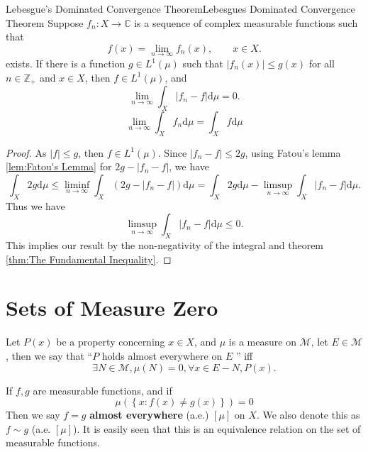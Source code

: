 \documentclass[../main.tex]{subfiles}
\begin{document}
\begin{theorem}{Lebesgue's Dominated Convergence Theorem}{Lebesgues Dominated Convergence Theorem}
	Suppose $f_n: X \rightarrow \mathbb{C}$ is a sequence of complex measurable functions such that
	\begin{equation*}
		f(x) = \lim_{n\rightarrow \infty } f_n(x), \qquad x\in X.
	\end{equation*}
	exists. If there is a function $g\in L^1(\mu)$ such that $\left|f_n(x)\right| \leq g(x)$ for all $n\in \mathbb{Z}_+$ and $x\in X$, then $f\in L^1(\mu)$, and
	\begin{equation*}
		\lim_{n \to \infty } \int_X \left|f_n-f\right| \mathrm{d} \mu = 0.
	\end{equation*}
	\begin{equation*}
		 \lim_{n \to \infty } \int_X f_n \mathrm{d} \mu = \int_X f \mathrm{d} \mu
	\end{equation*}
\end{theorem}
\begin{proof}
	As $\left|f\right|\leq g$, then $f\in L^1(\mu)$. Since $\left|f_n-f\right|\leq 2g$, using Fatou's lemma \ref{lem:Fatou's Lemma} for $2g-\left|f_n-f\right|$, we have
	\begin{equation*}
		\int_X 2g \mathrm{d} \mu \leq \liminf_{n\rightarrow \infty } \int_X \left(2g - \left|f_n-f\right|\right) \mathrm{d} \mu = \int_X 2g \mathrm{d} \mu - \limsup_{n\rightarrow \infty } \int_X \left|f_n-f\right| \mathrm{d} \mu.
	\end{equation*}
	Thus we have
	\begin{equation*}
		\limsup_{n\rightarrow \infty } \int_X \left|f_n-f\right| \mathrm{d} \mu \leq 0.
	\end{equation*}
	This implies our result by the non-negativity of the integral and theorem \ref{thm:The Fundamental Inequality}.
\end{proof}


\section{Sets of Measure Zero}
Let $P(x)$ be a property concerning $x\in X$, and $\mu$ is a measure on $\mathcal{M}$, let $E\in \mathcal{M}$, then we say that ``$P$ holds almost everywhere on $E$ '' iff
\begin{equation*}
\exists N\in \mathcal{M}, \mu(N)=0, \forall x\in E-N, P(x).
\end{equation*}

If $f,g$ are measurable functions, and if
\begin{equation*}
\mu(\left\{ x: f(x)\neq g(x) \right\}) = 0
\end{equation*}
Then we say $f=g$ \textbf{almost everywhere} (a.e.) $[\mu]$ on $X$. We also denote this as $f \sim g$ (a.e. $[\mu]$). It is easily seen that this is an equivalence relation on the set of measurable functions.
\end{document}
